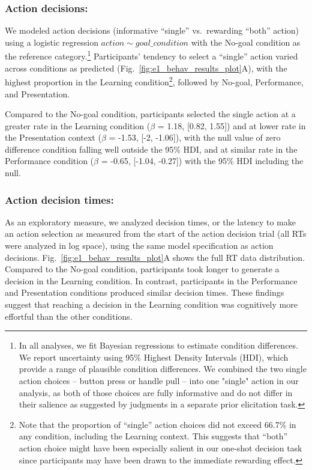 \documentclass[10pt, letterpaper]{article}
\begin{document}
\hypertarget{action-decisions}{%
\subsubsection{Action decisions:}\label{action-decisions}}

We modeled action decisions (informative ``single'' vs.~rewarding
``both'' action) using a logistic regression
\texttt{$action \sim goal\_condition$} with the No-goal condition as the
reference
category.\footnote{In all analyses, we fit Bayesian regressions to estimate condition differences. We report uncertainty using 95\% Highest Density Intervals (HDI), which provide a range of plausible condition differences. We combined the two single action choices -- button press or handle pull -- into one "single" action in our analysis, as both of those choices are fully informative and do not differ in their salience as suggested by judgments in a separate prior elicitation task.}
Participants' tendency to select a ``single'' action varied across
conditions as predicted (Fig.~\ref{fig:e1_behav_results_plot}A), with
the highest proportion in the Learning condition\footnote{Note that the
  proportion of ``single'' action choices did not exceed 66.7\% in any
  condition, including the Learning context. This suggests that ``both''
  action choice might have been especially salient in our one-shot
  decision task since participants may have been drawn to the immediate
  rewarding effect.}, followed by No-goal, Performance, and
Presentation.

Compared to the No-goal condition, participants selected the single
action at a greater rate in the Learning condition (\(\beta\) = 1.18,
{[}0.82, 1.55{]}) and at lower rate in the Presentation context
(\(\beta\) = -1.53, {[}-2, -1.06{]}), with the null value of zero
difference condition falling well outside the 95\% HDI, and at similar
rate in the Performance condition (\(\beta\) = -0.65, {[}-1.04,
-0.27{]}) with the 95\% HDI including the null.

\hypertarget{action-decision-times}{%
\subsubsection{Action decision times:}\label{action-decision-times}}

As an exploratory measure, we analyzed decision times, or the latency to
make an action selection as measured from the start of the action
decision trial (all RTs were analyzed in log space), using the same
model specification as action decisions.
Fig.~\ref{fig:e1_behav_results_plot}A shows the full RT data
distribution. Compared to the No-goal condition, participants took
longer to generate a decision in the Learning condition. In contrast,
participants in the Performance and Presentation conditions produced
similar decision times. These findings suggest that reaching a decision
in the Learning condition was cognitively more effortful than the other
conditions.
\end{document}
